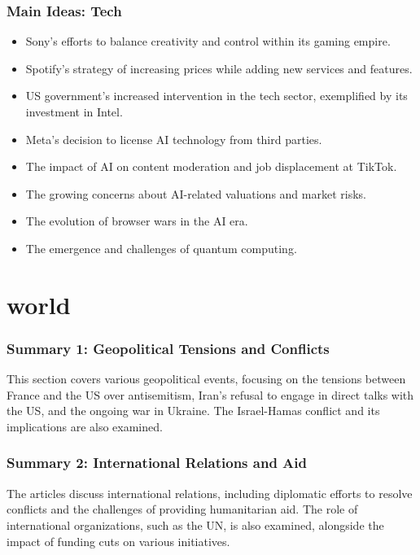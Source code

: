 \documentclass{beamer}
\begin{document}
\begin{frame}
\frametitle{Main Ideas: Tech}
\begin{itemize}
    \item Sony's efforts to balance creativity and control within its gaming empire.
    \item Spotify's strategy of increasing prices while adding new services and features.
    \item US government's increased intervention in the tech sector, exemplified by its investment in Intel.
    \item Meta's decision to license AI technology from third parties.
    \item The impact of AI on content moderation and job displacement at TikTok.
    \item The growing concerns about AI-related valuations and market risks.
    \item The evolution of browser wars in the AI era.
    \item The emergence and challenges of quantum computing.
\end{itemize}
\end{frame}


\section{world}

\begin{frame}
\frametitle{Summary 1: Geopolitical Tensions and Conflicts}
This section covers various geopolitical events, focusing on the tensions between France and the US over antisemitism, Iran's refusal to engage in direct talks with the US, and the ongoing war in Ukraine.  The Israel-Hamas conflict and its implications are also examined.
\end{frame}

\begin{frame}
\frametitle{Summary 2: International Relations and Aid}
The articles discuss international relations, including diplomatic efforts to resolve conflicts and the challenges of providing humanitarian aid. The role of international organizations, such as the UN, is also examined, alongside the impact of funding cuts on various initiatives.
\end{frame}
\end{document}
